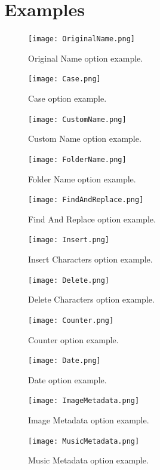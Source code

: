 \documentclass[10pt, a4paper]{scrartcl}
\begin{document}
\section{Examples}
\begin{figure}[!ht]
        \centering
        \texttt{[image: OriginalName.png]}
        \caption{Original Name option example.}
        \label{OriginalName}
\end{figure}
\begin{figure}[!ht]
        \centering
        \texttt{[image: Case.png]}
        \caption{Case option example.}
        \label{Case}
\end{figure}
\begin{figure}[!ht]
        \centering
        \texttt{[image: CustomName.png]}
        \caption{Custom Name option example.}
        \label{CustomName}
\end{figure}
\begin{figure}[!ht]
        \centering
        \texttt{[image: FolderName.png]}
        \caption{Folder Name option example.}
        \label{FolderName}
\end{figure}
\begin{figure}[!ht]
        \centering
        \texttt{[image: FindAndReplace.png]}
        \caption{Find And Replace option example.}
        \label{FindAndReplace}
\end{figure}
\begin{figure}[!ht]
        \centering
        \texttt{[image: Insert.png]}
        \caption{Insert Characters option example.}
        \label{Insert}
\end{figure}
\begin{figure}[!ht]
        \centering
        \texttt{[image: Delete.png]}
        \caption{Delete Characters option example.}
        \label{Delete}
\end{figure}
\begin{figure}[!ht]
        \centering
        \texttt{[image: Counter.png]}
        \caption{Counter option example.}
        \label{Counter}
\end{figure}
\begin{figure}[!ht]
        \centering
        \texttt{[image: Date.png]}
        \caption{Date option example.}
        \label{Date}
\end{figure}
\begin{figure}[!ht]
        \centering
        \texttt{[image: ImageMetadata.png]}
        \caption{Image Metadata option example.}
        \label{ImageMetadata}
\end{figure}
\begin{figure}[!ht]
        \centering
        \texttt{[image: MusicMetadata.png]}
        \caption{Music Metadata option example.}
        \label{MusicMetadata}
\end{figure}
\end{document}
